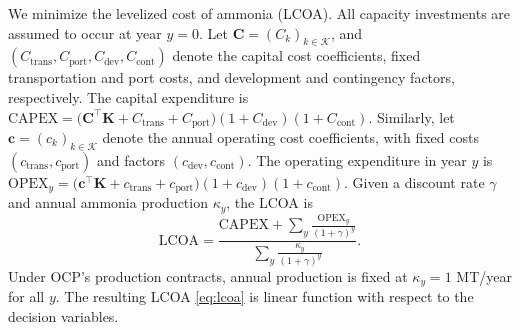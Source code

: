 \documentclass[11pt, letter]{article}
\begin{document}
We minimize the levelized cost of ammonia (LCOA). All capacity investments are assumed to occur at year $y=0$. Let $\boldsymbol{C}=(C_k)_{k \in \mathcal{K}}$, and $(C_{\text{trans}},C_{\text{port}},C_{\text{dev}},C_{\text{cont}})$ denote the capital cost coefficients, fixed transportation and port costs, and development and contingency factors, respectively. The capital expenditure is
\(
\text{CAPEX}
=
\big(
\boldsymbol{C}^\top\boldsymbol{K}
+
C_{\text{trans}}
+
C_{\text{port}}
\big)
(1+C_{\text{dev}})
(1+C_{\text{cont}}).
\)
Similarly, let $\boldsymbol{c}=(c_k)_{k \in \mathcal{K}}$ denote the annual operating cost coefficients, with fixed costs $(c_{\text{trans}},c_{\text{port}})$ and factors $(c_{\text{dev}},c_{\text{cont}})$. The operating expenditure in year $y$ is \(\text{OPEX}_y
=
\big(
\boldsymbol{c}^\top\boldsymbol{K}
+
c_{\text{trans}}
+
c_{\text{port}}
\big)
(1+c_{\text{dev}})
(1+c_{\text{cont}}). \) Given a discount rate $\gamma$ and annual ammonia production $\kappa_y$, the LCOA is
\begin{equation}
\label{eq:lcoa}
\text{LCOA}
=
\frac{
\text{CAPEX}
+
\sum_y \frac{\text{OPEX}_y}{(1+\gamma)^y}
}{
\sum_y \frac{\kappa_y}{(1+\gamma)^y}
}.
\end{equation}
Under OCP's production contracts, annual production is fixed at $\kappa_y=1$ MT/year for all $y$. The resulting LCOA \eqref{eq:lcoa} is linear function with respect to the decision variables.
\end{document}
